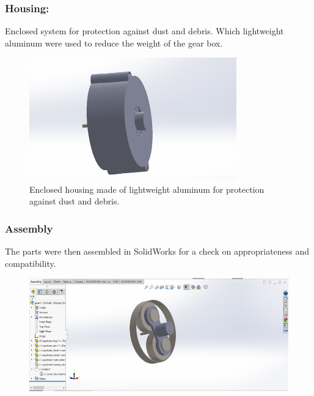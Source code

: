 \documentclass[../../main]{subfiles}
\begin{document}
\subsubsection{Housing:} 
Enclosed system for protection against dust and debris.
Which lightweight aluminum were used to reduce the weight of the gear
box.
\begin{figure}[h]
  \centering
  \includegraphics[width=0.8\textwidth]{sublatex/Opryrmi/media/image5.png} 
  \caption[Aluminum Housing for Dust Protection]{Enclosed housing made of lightweight aluminum for protection against dust and debris.}
\end{figure}

\newpage
\subsubsection{Assembly}

The parts were then assembled in SolidWorks for a check on
appropriateness and \\ compatibility.
\begin{figure}[h]
  \centering
\includegraphics[]{sublatex/Opryrmi/media/image6.png}
\caption{}
\end{figure}
\end{document}
